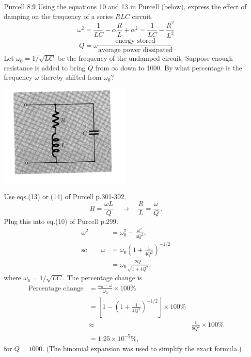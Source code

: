 \documentclass[makesolutionspdf]{esg8022pset}
\begin{document}
\begin{problem}{Purcell 8.9}
  Using the equations 10 and 13 in Purcell (below), express the effect of
  damping on the frequency of a series $RLC$ circuit.
  \begin{equation*}
    \omega^2 = \frac{1}{LC} - \alpha\frac{R}{L} + \alpha^2 = \frac{1}{LC} - \frac{R^2}{L^2}
  \end{equation*}
  \begin{equation*}
    Q = \omega \frac{\text{energy stored}}{\text{average power dissipated}}
  \end{equation*}
  Let $\omega_0 = 1 / \sqrt{LC}$ be the frequency of the undamped circuit.
  Suppose enough resistance is added to bring $Q$ from $\infty$ down to
  1000.  By what percentage is the frequency $\omega$ thereby shifted from
  $\omega_0$?
  
  \begin{center}
    \includegraphics[width = 0.5\textwidth]{figpu809}
  \end{center}
\end{problem}

\begin{solution}
  Use eqs.(13) or (14) of Purcell p.301-302.
  \begin{equation}
  R=\frac{\omega L}{Q} \quad\to\quad \frac{R}{L}=\frac{\omega}{Q}\,.
  \end{equation}
  Plug this into eq.(10) of Purcell p.299.
  \begin{align}
  \omega^2 & = \omega_0^2-\frac{\omega^2}{4Q^2},\\
  \text{so} \qquad \omega & = \omega_0 \left(1+\frac{1}{4Q^2}\right)^{-1/2}\\
  & = \omega_0\frac{2Q}{\sqrt{1+4Q^2}}.
  \end{align}
  where $\omega_0=1/\sqrt{LC}$.  The percentage change is
  \begin{align}
  \text{Percentage change} & = \frac{\omega_0-\omega}{\omega_0}\times
  100\%\nonumber\\
  & = \left[1-\left(1+\frac{1}{4Q^2}\right)^{-1/2}\right]\times 100\%\nonumber\\
  &\approx & \frac{1}{8Q^2}\times 100\%\nonumber\\
  & = 1.25\times 10^{-5} \%,
  \end{align}
  for $Q=1000$.  (The binomial expansion was used to simplify the exact formula.)

\end{solution}
\end{document}
